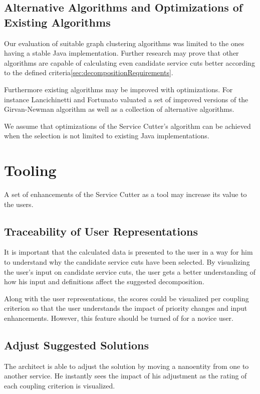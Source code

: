\subsection{Alternative Algorithms and Optimizations of Existing Algorithms}

Our evaluation of suitable graph clustering algorithms was limited to the ones having a stable Java implementation. Further research may prove that other algorithms are capable of calculating even candidate service cuts better according to the defined criteria\ref{sec:decompositionRequirements}.

Furthermore existing algorithms may be improved with optimizations. For instance Lancichinetti and Fortunato\cite{lancichinetti2009community} valuated a set of improved versions of the Girvan-Newman algorithm as well as a collection of alternative algorithms.

We assume that optimizations of the Service Cutter's algorithm can be achieved when the selection is not limited to existing Java implementations.

\section{Tooling}

A set of enhancements of the Service Cutter as a tool may increase its value to the users.

\subsection{Traceability of User Representations}

It is important that the calculated data is presented to the user in a way for him to understand why the candidate service cuts have been selected. By visualizing the user's input on candidate service cuts, the user gets a better understanding of how his input and definitions affect the suggested decomposition. 

Along with the user representations, the scores could be visualized per coupling criterion so that the user understands the impact of priority changes and input enhancements. However, this feature should be turned of for a novice user. 

\subsection{Adjust Suggested Solutions}

The architect is able to adjust the solution by moving a nanoentity from one to another service. He instantly sees the impact of his adjustment as the rating of each coupling criterion is visualized.

